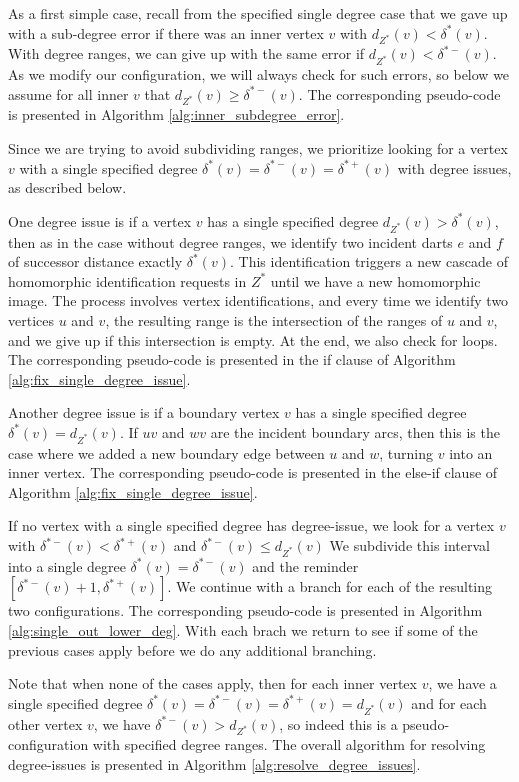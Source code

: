 \documentclass[10pt,a4paper]{article}
\begin{document}
As a first simple case, recall from the specified single degree case that we gave up with a sub-degree error if there was an inner vertex $v$ with $d_{Z^*}(v)<\delta^*(v)$. With degree ranges, we can give up with the same error if 
$d_{Z^*}(v)<\delta^{*-}(v)$.
As we modify our configuration, we will always check for such errors, so below we assume for
all inner $v$ that $d_{Z^*}(v)\geq \delta^{*-}(v)$.
The corresponding pseudo-code is presented in Algorithm \ref{alg:inner_subdegree_error}.

Since we are trying to avoid subdividing ranges, we prioritize looking for a vertex $v$ with a single
specified degree $\delta^*(v)=\delta^{*-}(v)=\delta^{*+}(v)$ with degree issues, as described below.

One degree issue is if a vertex $v$ has a single specified degree $d_{Z^*}(v) > \delta^*(v)$, then
as in the case without degree ranges, we identify 
two incident darts $e$ and $f$ of successor
distance exactly $\delta^*(v)$. This identification triggers
a new cascade of homomorphic identification requests in $Z^*$ until we have a new homomorphic image. The process involves vertex identifications, and every time we identify two vertices $u$ and $v$, the resulting
range is the intersection of the ranges of $u$ and $v$, and we give up if this intersection is empty. At the end, we also check for loops.
The corresponding pseudo-code is presented in the if clause of Algorithm \ref{alg:fix_single_degree_issue}.

Another degree issue is if 
a boundary vertex $v$ has a single specified degree $\delta^{*}(v)=d_{Z^*}(v)$.
If $uv$ and $wv$ are the incident boundary arcs, then this is the case where we added a  
new boundary edge between $u$ and $w$, turning $v$ into an inner vertex.
The corresponding pseudo-code is presented in the else-if clause of Algorithm \ref{alg:fix_single_degree_issue}.

If no vertex with a single specified degree has degree-issue, we look for a vertex $v$ with $\delta^{*-}(v)<\delta^{*+}(v)$ and $\delta^{*-}(v)\leq d_{Z^*}(v)$
We subdivide this interval into a single degree 
$\delta^{*}(v)=\delta^{*-}(v)$  
and the reminder $[\delta^{*-}(v)+1,
\delta^{*+}(v)]$. We continue with a branch for each of the resulting two configurations.
The corresponding pseudo-code is presented in Algorithm \ref{alg:single_out_lower_deg}.
With each brach we return to see if some of the previous cases apply before we do any additional branching.

Note that when none of the cases apply, then for each inner vertex $v$, we have a single specified degree $\delta^*(v)=\delta^{*-}(v)=\delta^{*+}(v)=d_{Z^*}(v)$ and for
each other vertex $v$, we have $\delta^{*-}(v)>d_{Z^*}(v)$, so indeed this is a pseudo-configuration with specified degree ranges.
The overall algorithm for resolving degree-issues is presented in Algorithm \ref{alg:resolve_degree_issues}.
\end{document}
